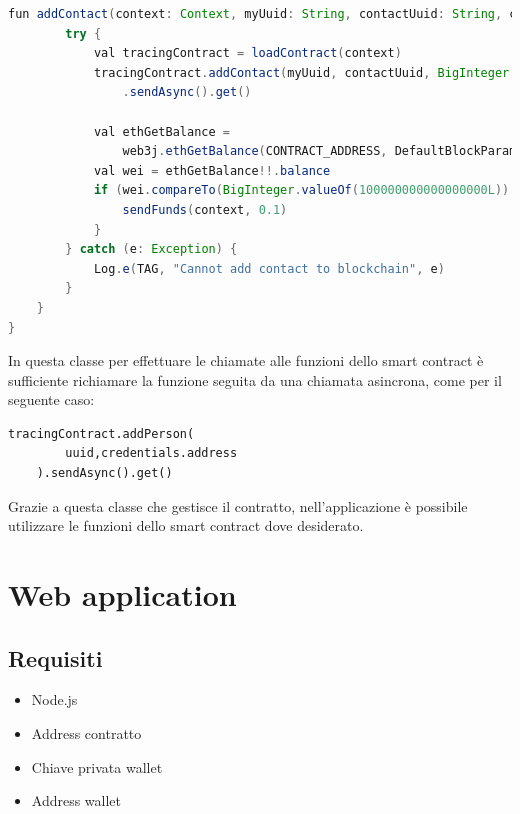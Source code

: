 \begin{lstlisting}[language = Java]
    fun addContact(context: Context, myUuid: String, contactUuid: String, contactIndex: Double) {
        try {
            val tracingContract = loadContract(context)
            tracingContract.addContact(myUuid, contactUuid, BigInteger.valueOf(contactIndex.toLong()))
                .sendAsync().get()

            val ethGetBalance =
                web3j.ethGetBalance(CONTRACT_ADDRESS, DefaultBlockParameterName.LATEST).sendAsync().get()
            val wei = ethGetBalance!!.balance
            if (wei.compareTo(BigInteger.valueOf(100000000000000000L)) == -1) {
                sendFunds(context, 0.1)
            }
        } catch (e: Exception) {
            Log.e(TAG, "Cannot add contact to blockchain", e)
        }
    }
}

\end{lstlisting} 

In questa classe per effettuare le chiamate alle funzioni dello smart contract è sufficiente richiamare la funzione seguita da una chiamata asincrona, come per il seguente caso:

\begin{lstlisting}[numbers=none]
	tracingContract.addPerson(
		uuid,credentials.address
	).sendAsync().get()
\end{lstlisting}
Grazie a questa classe che gestisce il contratto, nell'applicazione è possibile utilizzare le funzioni dello smart contract dove desiderato.

\section{Web application}
\subsection{Requisiti}
\begin{itemize}
	\item{Node.js}
	\item{Address contratto}
	\item{Chiave privata wallet}
	\item{Address wallet}
\end{itemize}
